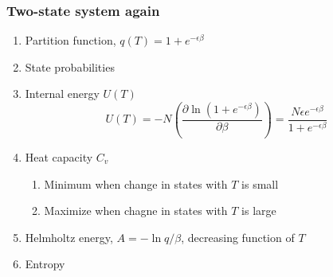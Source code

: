 \documentclass[11pt]{article}
\begin{document}
\subsubsection{Two-state system again}
\label{sec:org23c4a6d}
\begin{enumerate}
\item Partition function, \(q(T)=1+e^{-\epsilon\beta}\)
\item State probabilities
\item Internal energy \(U(T)\)
\begin{equation}
  U(T)=-N \left ( \frac{\partial \ln(1+e^{-\epsilon\beta})}{\partial\beta}
  \right)=\frac{N\epsilon e^{-\epsilon\beta}}{1+e^{-\epsilon\beta}}
\end{equation}
\item Heat capacity \(C_v\)
\begin{enumerate}
\item Minimum when change in states with \(T\) is small
\item Maximize when chagne in states with \(T\) is large
\end{enumerate}
\item Helmholtz energy, \(A= -\ln q/\beta\), decreasing function of \(T\)
\item Entropy
\end{enumerate}
\end{document}
